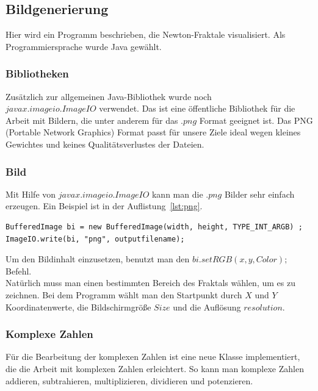 \documentclass[a4paper,12pt]{llncs}
\numberwithin{equation}{section}
\begin{document}
\subsection{Bildgenerierung}\label{subs:vis:bild}
Hier wird ein Programm beschrieben, die Newton-Fraktale visualisiert.
Als Programmiersprache wurde Java gewählt.

\subsubsection{Bibliotheken}
Zusätzlich zur allgemeinen Java-Bibliothek wurde noch\\ $javax$.$imageio$.$ImageIO$ verwendet.
Das ist eine öffentliche Bibliothek für die Arbeit mit Bildern, die unter anderem für das .$png$ Format geeignet ist.
Das PNG (Portable Network Graphics) Format passt für unsere Ziele ideal wegen kleines Gewichtes und keines Qualitätsverlustes der Dateien.

\subsubsection{Bild}
Mit Hilfe von $javax$.$imageio$.$ImageIO$ kann man die .$png$ Bilder sehr einfach erzeugen. 
Ein Beispiel ist in der Auflistung~\ref{lst:png}.
\begin{lstlisting}[float,caption=Ein Beispiel für die PNG Generierung, label=lst:png,captionpos=b]
BufferedImage bi = new BufferedImage(width, height, TYPE_INT_ARGB) ;
ImageIO.write(bi, "png", outputfilename);
\end{lstlisting}
Um den Bildinhalt einzusetzen, benutzt man den $bi.setRGB(x, y, Color);$ Befehl.\\
Natürlich muss man einen bestimmten Bereich des Fraktals wählen, um es zu zeichnen. 
Bei dem Programm wählt man den Startpunkt durch $X$ und $Y$ Koordinatenwerte, die Bildschirmgröße $Size$ und die Auflösung $resolution$. 

\subsubsection{Komplexe Zahlen}
Für die Bearbeitung der komplexen Zahlen ist eine neue Klasse implementiert, die die Arbeit mit komplexen Zahlen erleichtert. 
So kann man komplexe Zahlen addieren, subtrahieren, multiplizieren, dividieren und potenzieren.
\end{document}
